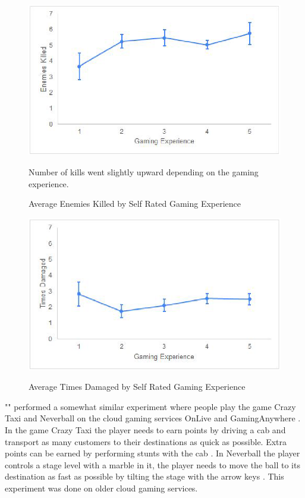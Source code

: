\begin{figure}[H]
	\centering
	\includegraphics[width=12cm]{../img/fig18.png}
	\caption{Average Enemies Killed by Self Rated Gaming Experience}
	Number of kills went slightly upward depending on the gaming experience.\\
	\parencite[Chapter 4.2.3, Page 41, Figure 18]{desveaux2020effects}
\end{figure}
\begin{figure}[H]
	\centering
	\includegraphics[width=12cm]{../img/fig19.png}
	\caption{Average Times Damaged by Self Rated Gaming Experience}
	\parencite[Chapter 4.2.3, Page 41, Figure 19]{desveaux2020effects}
\end{figure}
\newpage
"\textcite{claypool2014effects}" performed a somewhat similar experiment where people play the game Crazy Taxi and Neverball on the cloud gaming services OnLive and GamingAnywhere \parencite[Chapter 3]{claypool2014effects}. In the game Crazy Taxi the player needs to earn points by driving a cab and transport as many customers to their destinations as quick as possible. Extra points can be earned by performing stunts with the cab \parencite[Chapter 3.A]{claypool2014effects}. In Neverball the player controls a stage level with a marble in it, the player needs to move the ball to its destination as fast as possible by tilting the stage with the arrow keys \parencite[Chapter 3.A]{claypool2014effects}. This experiment was done on older cloud gaming services.
